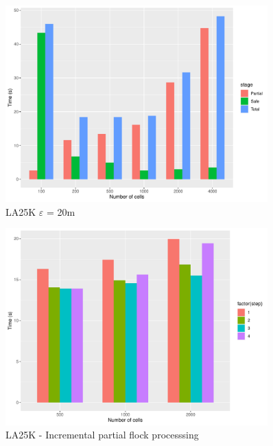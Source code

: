 \documentclass[a4paper,10pt]{article}
\begin{document}
\begin{figure}[h!]
 \centering
 \includegraphics[width=0.9\textwidth]{la25kE20_partitions.pdf}
 \caption{LA25K $\varepsilon$ = 20m}
 \label{fig:la25k20}
\end{figure}

\begin{figure}[h!]
 \centering
 \includegraphics[width=0.9\textwidth]{la25k_steps.pdf}
 \caption{LA25K - Incremental partial flock processsing}
 \label{fig:la25k_steps}
\end{figure}
\end{document}
